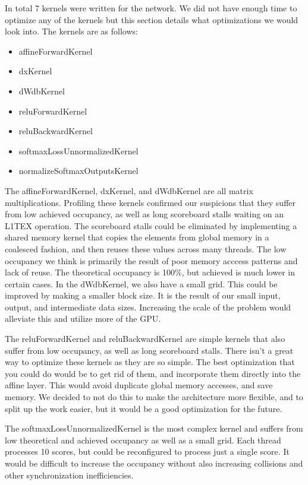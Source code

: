 \documentclass[conference]{IEEEtran}
\begin{document}
In total 7 kernels were written for the network. We did not have enough time to optimize any of the kernels but this section details what optimizations we would look into. The kernels are as follows:
\begin{itemize}
    \item affineForwardKernel
    \item dxKernel
    \item dWdbKernel
    \item reluForwardKernel
    \item reluBackwardKernel
    \item softmaxLossUnnormalizedKernel
    \item normalizeSoftmaxOutputsKernel
\end{itemize}

The affineForwardKernel, dxKernel, and dWdbKernel are all matrix multiplications. Profiling these kernels confirmed our suspicions that they suffer from low achieved occupancy, as well as long scoreboard stalls waiting on an L1TEX operation. The scoreboard stalls could be eliminated by implementing a shared memory kernel that copies the elements from global memory in a coalesced fashion, and then reuses these values across many threads. The low occupancy we think is primarily the result of poor memory acccess patterns and lack of reuse. The theoretical occupancy is 100\%, but achieved is much lower in certain cases. In the dWdbKernel, we also have a small grid. This could be improved by making a smaller block size. It is the result of our small input, output, and intermediate data sizes. Increasing the scale of the problem would alleviate this and utilize more of the GPU.

The reluForwardKernel and reluBackwardKernel are simple kernels that also suffer from low occupancy, as well as long scoreboard stalls. There isn't a great way to optimize these kernels as they are so simple. The best optimization that you could do would be to get rid of them, and incorporate them directly into the affine layer. This would avoid duplicate global memory accesses, and save memory. We decided to not do this to make the architecture more flexible, and to split up the work easier, but it would be a good optimization for the future.

The softmaxLossUnnormalizedKernel is the most complex kernel and suffers from low theoretical and achieved occupancy as well as a small grid. Each thread processes 10 scores, but could be reconfigured to process just a single score. It would be difficult to increase the occupancy without also increasing collisions and other synchronization inefficiencies.
\end{document}
